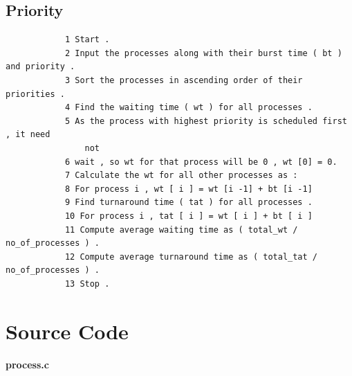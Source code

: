 \documentclass[13pt,oneside]{book}
\begin{document}
    \subsection*{Priority}
        \begin{verbatim}
            1 Start .
            2 Input the processes along with their burst time ( bt ) and priority .
            3 Sort the processes in ascending order of their priorities .
            4 Find the waiting time ( wt ) for all processes .
            5 As the process with highest priority is scheduled first , it need
                not
            6 wait , so wt for that process will be 0 , wt [0] = 0.
            7 Calculate the wt for all other processes as :
            8 For process i , wt [ i ] = wt [i -1] + bt [i -1]
            9 Find turnaround time ( tat ) for all processes .
            10 For process i , tat [ i ] = wt [ i ] + bt [ i ]
            11 Compute average waiting time as ( total_wt / no_of_processes ) .
            12 Compute average turnaround time as ( total_tat / no_of_processes ) .
            13 Stop .
        \end{verbatim}
\section*{Source Code}
\Large\textbf{process.c}
\small
\end{document}
